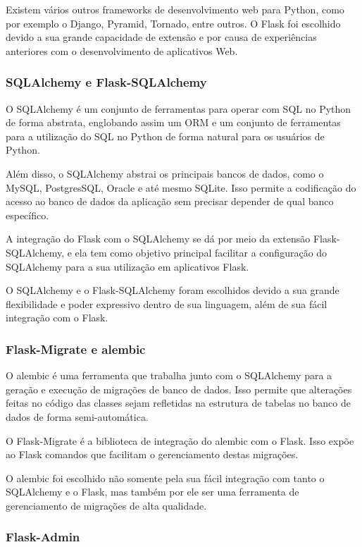 \documentclass[
	article,			%
	11pt,				%
	oneside,			%
	a4paper,			%
	english,			%
	brazil,				%
	sumario=tradicional
	]{abntex2}
\begin{document}
Existem vários outros frameworks de desenvolvimento web para Python, como por exemplo o Django, Pyramid, Tornado, entre outros.
O Flask foi escolhido devido a sua grande capacidade de extensão e por causa de experiências anteriores com o desenvolvimento de aplicativos Web.

\subsubsection{SQLAlchemy e Flask-SQLAlchemy}

O SQLAlchemy é um conjunto de ferramentas para operar com SQL no Python de forma abstrata, englobando assim um ORM e um conjunto de ferramentas para a utilização do SQL no Python de forma natural para os usuários de Python. \cite{sqlalchemy}

Além disso, o SQLAlchemy abstrai os principais bancos de dados, como o MySQL, PostgresSQL, Oracle e até mesmo SQLite.
Isso permite a codificação do acesso ao banco de dados da aplicação sem precisar depender de qual banco específico.

A integração do Flask com o SQLAlchemy se dá por meio da extensão Flask-SQLAlchemy, e ela tem como objetivo principal facilitar a configuração do SQLAlchemy para a sua utilização em aplicativos Flask. \cite{flasksqlalchemy}

O SQLAlchemy e o Flask-SQLAlchemy foram escolhidos devido a sua grande flexibilidade e poder expressivo dentro de sua linguagem, além de sua fácil integração com o Flask.

\subsubsection{Flask-Migrate e alembic}

O alembic é uma ferramenta que trabalha junto com o SQLAlchemy para a geração e execução de migrações de banco de dados.
Isso permite que alterações feitas no código das classes sejam refletidas na estrutura de tabelas no banco de dados de forma semi-automática. \cite{alembic}

O Flask-Migrate é a biblioteca de integração do alembic com o Flask.
Isso expõe ao Flask comandos que facilitam o gerenciamento destas migrações. \cite{flaskmigrate}

O alembic foi escolhido não somente pela sua fácil integração com tanto o SQLAlchemy e o Flask, mas também por ele ser uma ferramenta de gerenciamento de migrações de alta qualidade.

\subsubsection{Flask-Admin}
\end{document}
